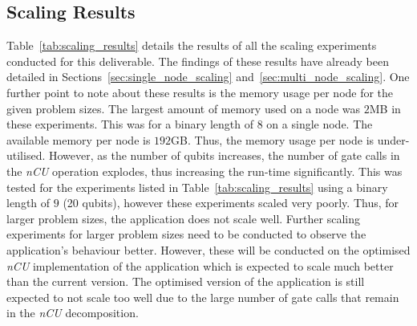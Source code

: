 \subsection{Scaling Results}
Table~\ref{tab:scaling_results} details the results of all the scaling experiments conducted for this deliverable. The findings of these results have already been detailed in Sections~\ref{sec:single_node_scaling} and~\ref{sec:multi_node_scaling}. One further point to note about these results is the memory usage per node for the given problem sizes. The largest amount of memory used on a node was $2$MB in these experiments. This was for a binary length of $8$ on a single node. The available memory per node is $192$GB. Thus, the memory usage per node is under-utilised. However, as the number of qubits increases, the number of gate calls in the \textit{nCU} operation explodes, thus increasing the run-time significantly. This was tested for the experiments listed in Table~\ref{tab:scaling_results} using a binary length of $9$ (20 qubits), however these experiments scaled very poorly. Thus, for larger problem sizes, the application does not scale well. Further scaling experiments for larger problem sizes need to be conducted to observe the application's behaviour better. However, these will be conducted on the optimised \textit{nCU} implementation of the application which is expected to scale much better than the current version. The optimised version of the application is still expected to not scale too well due to the large number of gate calls that remain in the \textit{nCU} decomposition.

